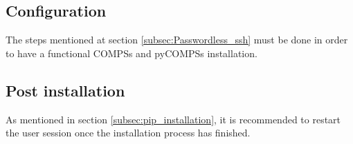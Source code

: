 \subsection{Configuration}
\label{subsec:pip_configuration}
The steps mentioned at section \ref{subsec:Passwordless_ssh} must be done in order to have a functional COMPSs and pyCOMPSs installation.
\subsection{Post installation}
As mentioned in section \ref{subsec:pip_installation}, it is recommended to restart the user session once the installation process has finished.